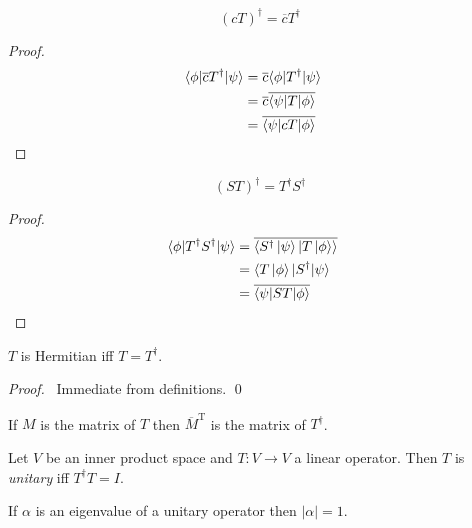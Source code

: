 \begin{prop}
\[ (cT)^\dagger = \overline{c} T^\dagger \]
\end{prop}

\begin{proof}
\pf
\begin{align*}
\langle \phi | \overline{c} T^\dagger | \psi \rangle
& = \overline{c} \langle \phi | T^\dagger | \psi \rangle \\
& = \overline{c} \overline{\langle \psi | T | \phi \rangle} \\
& = \overline{\langle \psi | cT | \phi \rangle} & \qed
\end{align*}
\end{proof}

\begin{prop}
\[ (ST)^\dagger = T^\dagger S^\dagger \]
\end{prop}

\begin{proof}
\pf
\begin{align*}
\langle \phi | T^\dagger S^\dagger | \psi \rangle
& = \overline{\langle S^\dagger \ket{\psi} | T \ket{\phi} \rangle} \\
& = \langle T \ket{\phi} | S^\dagger | \psi \rangle \\
& = \overline{\langle \psi | S T | \phi \rangle} & \qed
\end{align*}
\end{proof}

\begin{prop}
$T$ is Hermitian iff $T = T^\dagger$.
\end{prop}

\begin{proof}
\pf\ Immediate from definitions. \qed
\end{proof}

\begin{prop}
If $M$ is the matrix of $T$ then $\overline{M}^\mathrm{T}$ is the matrix of $T^\dagger$.
\end{prop}

\begin{df}[Unitary]
Let $V$ be an inner product space and $T : V \rightarrow V$ a linear operator. Then $T$ is \emph{unitary} iff $T^\dagger T = I$.
\end{df}

\begin{prop}
If $\alpha$ is an eigenvalue of a unitary operator then $|\alpha| = 1$.
\end{prop}

